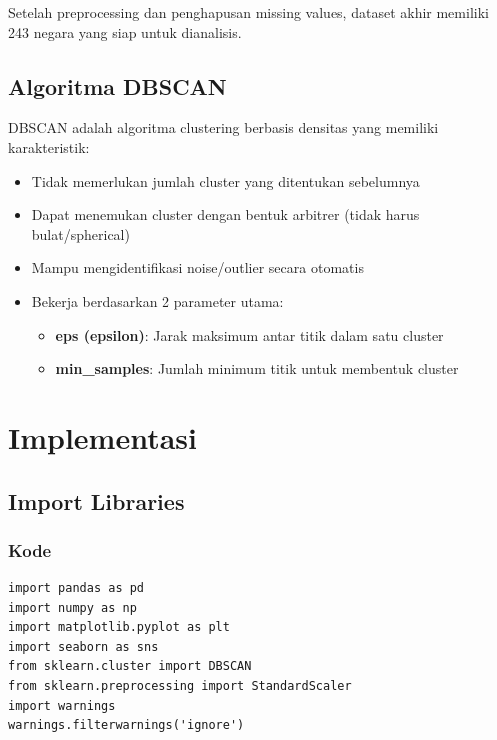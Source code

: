 \documentclass[12pt,a4paper]{article}
\begin{document}
Setelah preprocessing dan penghapusan missing values, dataset akhir memiliki 243 negara yang siap untuk dianalisis.

\subsection{Algoritma DBSCAN}
DBSCAN adalah algoritma clustering berbasis densitas yang memiliki karakteristik:
\begin{itemize}
    \item Tidak memerlukan jumlah cluster yang ditentukan sebelumnya
    \item Dapat menemukan cluster dengan bentuk arbitrer (tidak harus bulat/spherical)
    \item Mampu mengidentifikasi noise/outlier secara otomatis
    \item Bekerja berdasarkan 2 parameter utama:
    \begin{itemize}
        \item \textbf{eps (epsilon)}: Jarak maksimum antar titik dalam satu cluster
        \item \textbf{min\_samples}: Jumlah minimum titik untuk membentuk cluster
    \end{itemize}
\end{itemize}

\newpage
\section{Implementasi}

\subsection{Import Libraries}

\subsubsection{Kode}
\begin{lstlisting}[style=pythonstyle]
import pandas as pd
import numpy as np
import matplotlib.pyplot as plt
import seaborn as sns
from sklearn.cluster import DBSCAN
from sklearn.preprocessing import StandardScaler
import warnings
warnings.filterwarnings('ignore')
\end{lstlisting}
\end{document}
